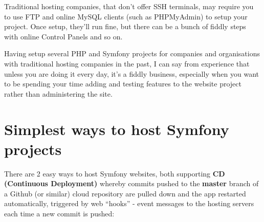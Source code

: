 \documentclass[a4paperpaper,openright]{book}
\begin{document}
Traditional hosting companies, that don't offer SSH terminals, may
require you to use FTP and online MySQL clients (such as PHPMyAdmin) to
setup your project. Once setup, they'll run fine, but there can be a
bunch of fiddly steps with online Control Panels and so on.

Having setup several PHP and Symfony projects for companies and
organisations with traditional hosting companies in the past, I can say
from experience that unless you are doing it every day, it's a fiddly
business, especially when you want to be spending your time adding and
testing features to the website project rather than administering the
site.

\hypertarget{simplest-ways-to-host-symfony-projects}{%
\section{Simplest ways to host Symfony
projects}\label{simplest-ways-to-host-symfony-projects}}

There are 2 easy ways to host Symfony websites, both supporting
\textbf{CD (Continuous Deployment)} whereby commits pushed to the
\textbf{master} branch of a Github (or similar) cloud repository are
pulled down and the app restarted automatically, triggered by web
``hooks'' - event messages to the hosting servers each time a new commit
is pushed:
\end{document}
